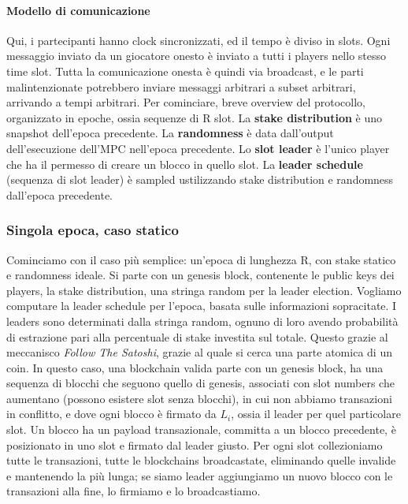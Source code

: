 \documentclass[11pt]{article}
\begin{document}
\paragraph{Modello di comunicazione} Qui, i partecipanti hanno clock sincronizzati, ed il tempo è diviso in slots. Ogni messaggio inviato da un giocatore onesto è inviato a tutti i players nello stesso time slot. Tutta la comunicazione onesta è quindi via broadcast, e le parti malintenzionate potrebbero inviare messaggi arbitrari a subset arbitrari, arrivando a tempi arbitrari. Per cominciare, breve overview del protocollo, organizzato in epoche, ossia sequenze di R slot. La \textbf{stake distribution} è uno snapshot dell'epoca precedente. La \textbf{randomness} è data dall'output dell'esecuzione dell'MPC nell'epoca precedente. Lo \textbf{slot leader} è l'unico player che ha il permesso di creare un blocco in quello slot. La \textbf{leader schedule} (sequenza di slot leader) è sampled ustilizzando stake distribution e randomness dall'epoca precedente.
\subsubsection{Singola epoca, caso statico}
Cominciamo con il caso più semplice: un'epoca di lunghezza R, con stake statico e randomness ideale. Si parte con un genesis block, contenente le public keys dei players, la stake distribution, una stringa random per la leader election. Vogliamo computare la leader schedule per l'epoca, basata sulle informazioni sopracitate. I leaders sono determinati dalla stringa random, ognuno di loro avendo probabilità di estrazione pari alla percentuale di stake investita sul totale. Questo grazie al meccanisco \textit{Follow The Satoshi}, grazie al quale si cerca una parte atomica di un coin. In questo caso, una blockchain valida parte con un genesis block, ha una sequenza di blocchi che seguono quello di genesis, associati con slot numbers che aumentano (possono esistere slot senza blocchi), in cui non abbiamo transazioni in conflitto, e dove ogni blocco è firmato da $L_i$, ossia il leader per quel particolare slot. Un blocco ha un payload transazionale, committa a un blocco precedente, è posizionato in uno slot e firmato dal leader giusto. Per ogni slot collezioniamo tutte le transazioni, tutte le blockchains broadcastate, eliminando quelle invalide e mantenendo la più lunga; se siamo leader aggiungiamo un nuovo blocco con le transazioni alla fine, lo firmiamo e lo broadcastiamo. 
\end{document}
